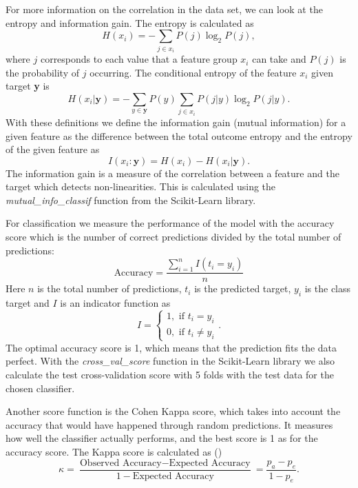 \documentclass[12pt,a4paper,english]{article}
\begin{document}
For more information on the correlation in the data set, we can look at the entropy and information gain. The entropy is calculated as
\begin{equation*}
H(x_i)=-\sum_{j\in x_i}P(j)\log_2P(j),
\end{equation*}
where $j$ corresponds to each value that a feature group $x_i$ can take and $P(j)$ is the probability of $j$ occurring. The conditional entropy of the feature $x_i$ given target \textbf{y} is 
\begin{equation*}
H(x_i|\textbf{y})=-\sum_{y\in\textbf{y}}P(y)\sum_{j\in x_i}P(j|y)\log_2P(j|y).
\end{equation*} 
With these definitions we define the information gain (mutual information) for a given feature as the difference between the total outcome entropy and the entropy of the given feature as
\begin{equation}
\label{eq:inf_gain}
I(x_i:\textbf{y})=H(x_i)-H(x_i|\textbf{y}).
\end{equation}
The information gain is a measure of the correlation between a feature and the target which detects non-linearities. This is calculated using the \textit{mutual\_info\_classif} function from the Scikit-Learn library.

For classification we measure the performance of the model with the accuracy score which is the number of correct predictions divided by the total number of predictions:
\begin{equation}
\label{eq:accuracy}
\text{Accuracy}=\frac{\sum_{i=1}^{n}I(t_i=y_i)}{n}
\end{equation}
Here $n$ is the total number of predictions, $t_i$ is the predicted target, $y_i$ is the class target and $I$ is an indicator function as
\[I=\begin{cases}
1, \text{ if } t_i=y_i\\
0, \text{ if } t_i\neq y_i
\end{cases}.\]
The optimal accuracy score is 1, which means that the prediction fits the data perfect. With the \textit{cross\_val\_score} function in the Scikit-Learn library we also calculate the test cross-validation score with 5 folds with the test data for the chosen classifier.

Another score function is the Cohen Kappa score, which takes into account the accuracy that would have happened through random predictions. It measures how well the classifier actually performs, and the best score is 1 as for the accuracy score. The Kappa score is calculated as (\cite{kappa})
\begin{equation}
\label{eq:kappa}
\kappa=\frac{\text{Observed Accuracy} - \text{Expected Accuracy}}{1-\text{Expected Accuracy}}=\frac{p_a-p_e}{1-p_e}.
\end{equation}
\end{document}
